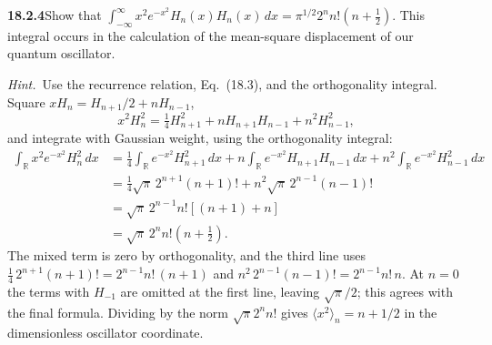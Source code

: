 \par\bigskip
\noindent\textbf{18.2.4}\quad Show that
$\displaystyle\int_{-\infty}^{\infty}
x^{2}e^{-x^{2}}H_{n}(x)H_{n}(x)\,dx
=\pi^{1/2}2^{n}n!\left(n+\frac{1}{2}\right)$.
This integral occurs in the calculation of the mean-square
displacement of our quantum oscillator.
\par\emph{Hint.}~Use the recurrence relation, Eq.~(18.3), and the
orthogonality integral.
\solution
Square $xH_n=H_{n+1}/2+nH_{n-1}$,
\[
x^2H_n^2=\tfrac14H_{n+1}^2+nH_{n+1}H_{n-1}+n^2H_{n-1}^2,
\]
and integrate with Gaussian weight, using the orthogonality integral:
\begin{align*}
\int_{\mathbb R}x^2e^{-x^2}H_n^2\,dx
 &=\frac14\int_{\mathbb R}e^{-x^2}H_{n+1}^2\,dx
   +n\int_{\mathbb R}e^{-x^2}H_{n+1}H_{n-1}\,dx
   +n^2\int_{\mathbb R}e^{-x^2}H_{n-1}^2\,dx\\
 &=\frac14\sqrt\pi\,2^{n+1}(n+1)!
   +n^2\sqrt\pi\,2^{n-1}(n-1)!\\
 &=\sqrt\pi\,2^{n-1}n![(n+1)+n]\\
 &=\boxed{\sqrt\pi\,2^nn!\left(n+\tfrac12\right)}.
\end{align*}
The mixed term is zero by orthogonality, and the third line uses
$\tfrac14\,2^{n+1}(n+1)!=2^{n-1}n!\,(n+1)$ and
$n^2\,2^{n-1}(n-1)!=2^{n-1}n!\,n$.  At $n=0$ the terms with
$H_{-1}$ are omitted at the first line, leaving $\sqrt\pi/2$;
this agrees with the final formula.  Dividing by the norm
$\sqrt\pi2^nn!$ gives $\langle x^2\rangle_n=n+1/2$ in the
dimensionless oscillator coordinate.

